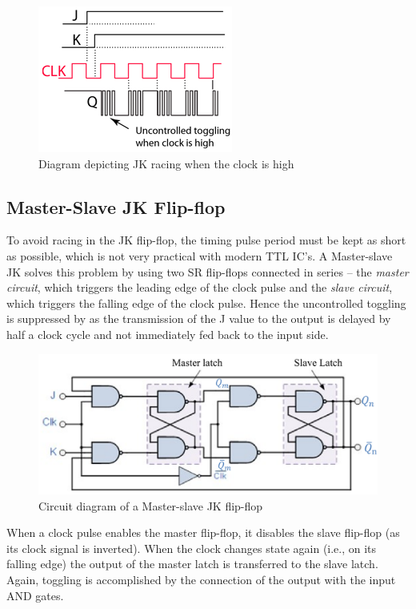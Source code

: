 \begin{figure}[H]
    \centering
    \includegraphics[width=0.55\columnwidth]{images/jkrace1.png}
    \caption{Diagram depicting JK racing when the clock is high}
    \label{race0}
\end{figure}

\subsection*{Master-Slave JK Flip-flop}
To avoid racing in the JK flip-flop, the timing pulse period must be kept as short as possible, which is not very practical with modern TTL IC's. A Master-slave JK solves this problem by using two SR flip-flops connected in series -- the \textit{master circuit}, which triggers the leading edge of the clock pulse and the \textit{slave circuit}, which triggers the falling edge of the clock pulse. Hence the uncontrolled toggling is suppressed by as the transmission of the J value to the output is delayed by half a clock cycle and not immediately fed back to the input side.

\begin{figure}[H]
    \centering
    \includegraphics[width=0.90\columnwidth]{images/msjk.png}
    \caption{Circuit diagram of a Master-slave JK flip-flop}
    \label{5}
\end{figure}

When a clock pulse enables the master flip-flop, it disables the slave flip-flop (as its clock signal is inverted). When the clock
changes state again (i.e., on its falling edge) the output of the master latch is transferred
to the slave latch. Again, toggling is accomplished by the connection of the output with
the input AND gates.

